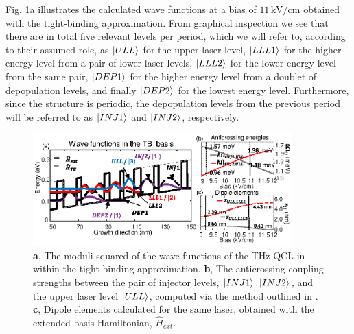 \documentclass[10pt]{article}
\begin{document}
	Fig. \ref{fig:img02}a illustrates the calculated wave functions at a bias of
	$11{\,}\mathrm{kV}/\mathrm{cm}$ obtained with the tight-binding approximation.
	From graphical inspection we see that there are in total five relevant
	levels per period, which we will refer to, according to their assumed role, as
	$\Ket{ULL}$ for the upper laser level, $\Ket{LLL1}$ for the higher energy
	level from a pair of lower laser levels, $\Ket{LLL2}$ for the lower energy
	level from the same pair, $\Ket{DEP1}$ for the higher energy level from a
	doublet of depopulation levels, and finally $\Ket{DEP2}$ for the lowest energy
	level. Furthermore, since the structure is periodic, the depopulation levels
	from the previous period will be referred to as $\Ket{INJ1}$ and $\Ket{INJ2}$, respectively.
	
	\begin{figure}[h!]
		\begin{center}
			\includegraphics[width=10cm]{FL183S.eps}
		\end{center}
		\caption{\textbf{a}, The moduli squared of the wave functions of the THz QCL
			in \cite{burghoff2014terahertz} within the tight-binding approximation.
			\textbf{b}, The anticrossing coupling strengths between the pair of injector
			levels, $\ket{INJ1},\ket{INJ2}$, and the upper laser level $\ket{ULL}$,
			computed via the method outlined in \cite{bastardwave}. \textbf{c}, Dipole
			elements calculated for the same laser, obtained with the extended basis
			Hamiltonian, $\hat{H}_{ext}$.}%
		\label{fig:img02}%
	\end{figure}
	
\end{document}
